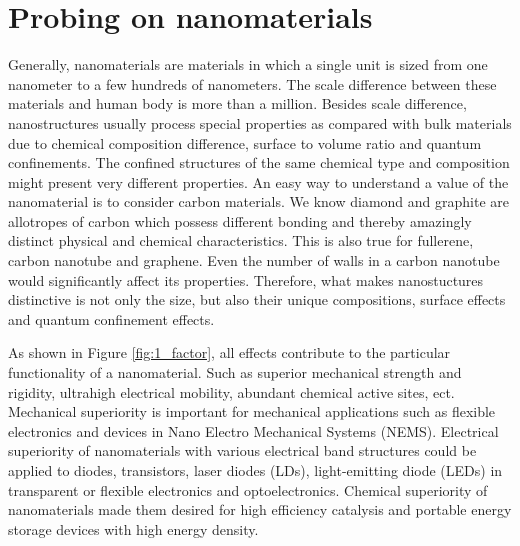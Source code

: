 \section{Probing on nanomaterials}
Generally, nanomaterials are materials in which a single unit is sized from one nanometer to a few hundreds of nanometers. The scale difference between these materials and human body is more than a million. Besides scale difference, nanostructures usually process special properties as compared with bulk materials due to chemical composition difference, surface to volume ratio and quantum confinements. The confined structures of the same chemical type and composition might present very different properties. An easy way to understand a value of the nanomaterial is to consider carbon materials. We know diamond and graphite are allotropes of carbon which possess different bonding and thereby amazingly distinct physical and chemical characteristics. This is also true for fullerene, carbon nanotube and graphene. Even the number of walls in a carbon nanotube would significantly affect its properties. \cite{rodunerwhynano2006} Therefore, what makes nanostuctures distinctive is not only the size, but also their unique compositions, surface effects and quantum confinement effects. 

\renewcommand{\thefootnote}{\fnsymbol{footnote}}

As shown in Figure \ref{fig:1_factor}, all effects contribute to the particular functionality of a nanomaterial. Such as superior mechanical strength and rigidity, ultrahigh electrical mobility, abundant chemical active sites, ect. Mechanical superiority is important for mechanical applications such as flexible electronics and devices in Nano Electro Mechanical Systems (NEMS). Electrical superiority of nanomaterials with various electrical band structures could be applied to diodes, transistors, laser diodes (LDs), light-emitting diode (LEDs) in transparent or flexible electronics and optoelectronics. Chemical superiority of nanomaterials made them desired for high efficiency catalysis and portable energy storage devices with high energy density. 


